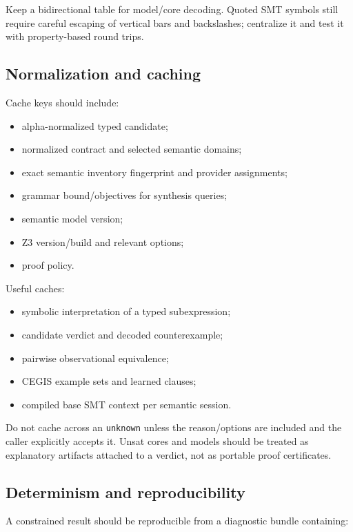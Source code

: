 \documentclass[11pt,oneside]{article}
\newcommand{\code}[1]{\texttt{#1}}
\begin{document}
Keep a bidirectional table for model/core decoding. Quoted SMT symbols still require
careful escaping of vertical bars and backslashes; centralize it and test it with
property-based round trips.

\subsection{Normalization and caching}

Cache keys should include:

\begin{itemize}
  \item alpha-normalized typed candidate;
  \item normalized contract and selected semantic domains;
  \item exact semantic inventory fingerprint and provider assignments;
  \item grammar bound/objectives for synthesis queries;
  \item semantic model version;
  \item Z3 version/build and relevant options;
  \item proof policy.
\end{itemize}

Useful caches:

\begin{itemize}
  \item symbolic interpretation of a typed subexpression;
  \item candidate verdict and decoded counterexample;
  \item pairwise observational equivalence;
  \item CEGIS example sets and learned clauses;
  \item compiled base SMT context per semantic session.
\end{itemize}

Do not cache across an \code{unknown} unless the reason/options are included and the
caller explicitly accepts it. Unsat cores and models should be treated as explanatory
artifacts attached to a verdict, not as portable proof certificates.

\subsection{Determinism and reproducibility}

A constrained result should be reproducible from a diagnostic bundle containing:
\end{document}
